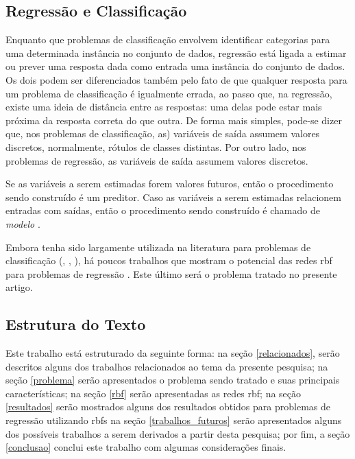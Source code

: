 \documentclass[conference]{IEEEtran}
\begin{document}
\subsection{Regressão e Classificação}
\label{regressaoxclassificacao}

Enquanto que problemas de classificação envolvem identificar categorias para 
uma determinada instância no conjunto de dados, regressão está ligada a estimar 
ou prever uma resposta dada como entrada uma instância do conjunto de dados. 
Os dois podem ser diferenciados também pelo fato de que qualquer resposta 
para um problema de classificação é igualmente errada, ao passo que, na 
regressão, existe uma ideia de distância entre as respostas: uma delas pode 
estar mais próxima da resposta correta do que outra. De forma mais simples, 
pode-se dizer que, nos problemas de classificação, as) variáveis de saída 
assumem valores discretos, normalmente, rótulos de classes distintas. Por outro 
lado, nos problemas de regressão, as variáveis de saída assumem valores 
discretos.

Se as variáveis a serem estimadas forem valores futuros, então o procedimento 
sendo construído é um preditor. Caso as variáveis a serem estimadas relacionem 
entradas com saídas, então o procedimento sendo construído é chamado de 
\textit{modelo} \cite{specht1991general}.

Embora tenha sido largamente utilizada na literatura para problemas de 
classificação (\cite{heartrbf}, \cite{wu2012using}, 
\cite{DBLP:conf/isnn/ZhaoYWWL06}), há poucos trabalhos que mostram o potencial 
das redes \ac*{rbf} para problemas de regressão \cite{rojas2002time}. Este 
último será o problema tratado no presente artigo.

\subsection{Estrutura do Texto}
\label{estrutura}

Este trabalho está estruturado da seguinte forma: na seção \ref{relacionados}, 
serão descritos alguns dos trabalhos relacionados ao tema da presente pesquisa; 
na seção \ref{problema} serão apresentados o problema sendo tratado e suas 
principais características; na seção \ref{rbf} serão apresentadas as redes 
\ac*{rbf}; na seção \ref{resultados} serão mostrados alguns dos resultados 
obtidos para problemas de regressão utilizando \acp*{rbf} na seção 
\ref{trabalhos_futuros} serão apresentados alguns dos possíveis trabalhos a 
serem derivados a partir desta pesquisa; por fim, a seção \ref{conclusao} 
conclui este trabalho com algumas considerações finais.
\end{document}
